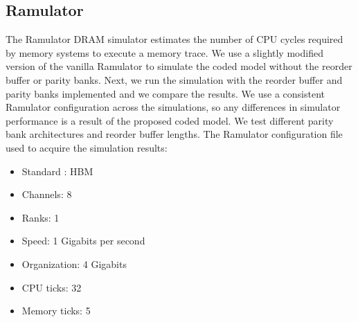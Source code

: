 \subsection{Ramulator}
The Ramulator DRAM simulator estimates the number of CPU cycles required by memory systems to execute a memory trace\cite{Ramulator}. We use a slightly modified version of the vanilla Ramulator to simulate the coded model without the reorder buffer or parity banks. Next, we run the simulation with the reorder buffer and parity banks implemented and we compare the results. We use a consistent Ramulator configuration across the simulations, so any differences in simulator performance is a result of the proposed coded model. We test different parity bank architectures and reorder buffer lengths. The Ramulator configuration file used to acquire the simulation results: 

\begin{itemize}
\item Standard : HBM
\item Channels: 8
\item Ranks: 1
\item Speed: 1 Gigabits per second
\item Organization: 4 Gigabits
\item CPU ticks: 32
\item Memory ticks: 5
\end{itemize}




